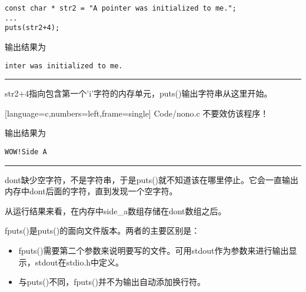 \begin{frame}[fragile] 
\begin{lstlisting}[basicstyle=\ttfamily]
const char * str2 = "A pointer was initialized to me.";
...
puts(str2+4);
\end{lstlisting}
输出结果为
\begin{lstlisting}[basicstyle=\ttfamily]
inter was initialized to me.
\end{lstlisting} 
\pause \rule{\textwidth}{0.3mm} \vspace{0.1mm}

{\tf str2+4}指向包含第一个{\tf 'i'}字符的内存单元，{\tf puts()}输出字符串从这里开始。
\end{frame}

\begin{frame}[fragile] 

[language=c,numbers=left,frame=single]
{Code/nono.c}
\pause 
不要效仿该程序！
\end{frame}

\begin{frame}[fragile]
输出结果为
\begin{lstlisting}[basicstyle=\ttfamily]
WOW!Side A
\end{lstlisting} 
\pause \rule{\textwidth}{0.3mm} \vspace{0.1mm}

{\tf dont}缺少空字符，不是字符串，于是{\tf puts()}就不知道该在哪里停止。它会一直输出内存中{\tf dont}后面的字符，直到发现一个空字符。\vspace{0.1mm}

从运行结果来看，在内存中{\tf side\_a}数组存储在{\tf dont}数组之后。
\end{frame}

\begin{frame}[fragile] 
{\tf fputs()}是{\tf puts()}的面向文件版本。两者的主要区别是：\vspace{0.1mm}

\begin{itemize}
\item
{\tf fputs()}需要第二个参数来说明要写的文件。可用{\tf stdout}作为参数来进行输出显示，{\tf stdout}在{\tf stdio.h}中定义。 \\[0.1in]
\item 
与{\tf puts()}不同，{\tf fputs()}并不为输出自动添加换行符。
\end{itemize}
\end{frame}

